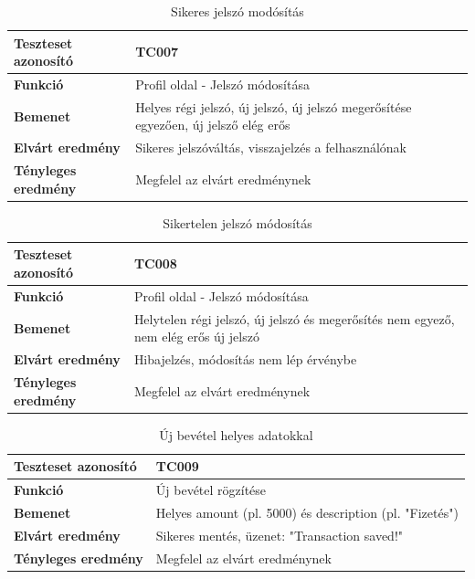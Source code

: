 \begin{table}[h!]
	\centering
	\begin{tabular}{|l|p{10cm}|}
		\hline
		\textbf{Teszteset azonosító} & TC007 \\ \hline
		\textbf{Funkció} & Profil oldal - Jelszó módosítása \\ \hline
		\textbf{Bemenet} & Helyes régi jelszó, új jelszó, új jelszó megerősítése egyezően, új jelsző elég erős \\ \hline
		\textbf{Elvárt eredmény} & Sikeres jelszóváltás, visszajelzés a felhasználónak \\ \hline
		\textbf{Tényleges eredmény} & Megfelel az elvárt eredménynek \\ \hline
	\end{tabular}
	\caption{Sikeres jelszó modósítás}
	\label{tab:profil_jelszo_modositas}
\end{table}

\begin{table}[h!]
	\centering
	\begin{tabular}{|l|p{10cm}|}
		\hline
		\textbf{Teszteset azonosító} & TC008 \\ \hline
		\textbf{Funkció} & Profil oldal - Jelszó módosítása \\ \hline
		\textbf{Bemenet} & Helytelen régi jelszó, új jelszó és megerősítés nem egyező, nem elég erős új jelszó \\ \hline
		\textbf{Elvárt eredmény} & Hibajelzés, módosítás nem lép érvénybe \\ \hline
		\textbf{Tényleges eredmény} & Megfelel az elvárt eredménynek \\ \hline
	\end{tabular}
	\caption{Sikertelen jelszó módosítás}
	\label{tab:jelszo_modositas_rossz_regi}
\end{table}

\begin{table}[h!]
	\centering
	\begin{tabular}{|l|p{10cm}|}
		\hline
		\textbf{Teszteset azonosító} & TC009 \\ \hline
		\textbf{Funkció} & Új bevétel rögzítése \\ \hline
		\textbf{Bemenet} & Helyes amount (pl. 5000) és description (pl. "Fizetés") \\ \hline
		\textbf{Elvárt eredmény} & Sikeres mentés, üzenet: "Transaction saved!" \\ \hline
		\textbf{Tényleges eredmény} & Megfelel az elvárt eredménynek \\ \hline
	\end{tabular}
	\caption{Új bevétel helyes adatokkal}
	\label{tab:uj_bevetel_helyes}
\end{table}

